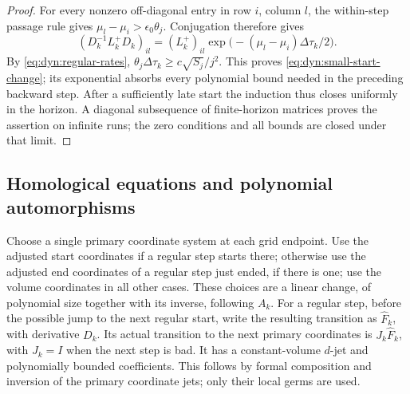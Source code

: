 \begin{proof}
For every nonzero off-diagonal entry in row $i$, column $l$, the
within-step passage rule gives $\mu_l-\mu_i>\epsilon_0\theta_j$.
Conjugation therefore gives
\[
 (D_k^{-1}L_k^+D_k)_{il}
 =(L_k^+)_{il}\exp\bigl(- (\mu_l-\mu_i)\Delta\tau_k/2\bigr).
\]
By \eqref{eq:dyn:regular-rates},
$\theta_j\Delta\tau_k\ge c\sqrt{S_j}/j^2$.
This proves \eqref{eq:dyn:small-start-change}; its exponential absorbs
every polynomial bound needed in the preceding backward step.
After a sufficiently late start the induction thus closes uniformly
in the horizon.  A diagonal subsequence of finite-horizon matrices
proves the assertion on infinite runs; the zero conditions and all
bounds are closed under that limit.
\end{proof}

\subsection{Homological equations and polynomial automorphisms}

Choose a single primary coordinate system at each grid endpoint.
Use the adjusted start coordinates if a regular step starts there;
otherwise use the adjusted end coordinates of a regular step just
ended, if there is one; use the volume coordinates in all other cases.
These choices are a linear change, of polynomial size together with
its inverse, following $A_k$.  For a regular step, before the possible
jump to the next regular start, write the resulting transition as
$\widehat F_k$, with derivative $D_k$.  Its actual transition to the
next primary coordinates is $J_k\widehat F_k$, with $J_k=I$ when the
next step is bad.  It has a constant-volume $d$-jet and polynomially
bounded coefficients.  This follows by formal composition and
inversion of the primary coordinate jets; only their local germs are
used.

